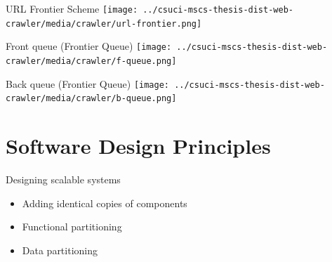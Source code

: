\documentclass[9pt]{beamer}
\begin{document}

\begin{frame}{URL Frontier Scheme}
  \centering
  \texttt{[image: ../csuci-mscs-thesis-dist-web-crawler/media/crawler/url-frontier.png]}
\end{frame}


\begin{frame}{Front queue (Frontier Queue)}
  \centering
  \texttt{[image: ../csuci-mscs-thesis-dist-web-crawler/media/crawler/f-queue.png]}
\end{frame}


\begin{frame}{Back queue (Frontier Queue)}
  \centering
  \texttt{[image: ../csuci-mscs-thesis-dist-web-crawler/media/crawler/b-queue.png]}
\end{frame}


\section[Soft. design]{Software Design Principles}
\begin{frame}[plain]
\end{frame}


\begin{frame}{Designing scalable systems}
  \begin{itemize}
    \pause
  \item Adding identical copies of components
    \pause
  \item Functional partitioning
    \begin{figure}
    \end{figure}
    \pause
  \item Data partitioning
  \end{itemize}
\end{frame}

\end{document}
